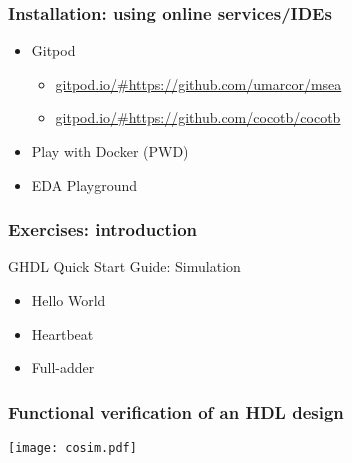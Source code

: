 \documentclass[xcolor={usenames,dvipsnames,svgnames}]{beamer}
\begin{document}
\begin{frame}
\frametitle{Installation: using online services/IDEs}
\vfill
\begin{itemize}
\item Gitpod \href{https://gitpod.io}{\faGlobe}
  \begin{itemize}
    \item \href{https://gitpod.io/\#https://github.com/umarcor/msea}{gitpod.io/\#https://github.com/umarcor/msea}
    \item \href{https://gitpod.io/\#https://github.com/cocotb/cocotb}{gitpod.io/\#https://github.com/cocotb/cocotb}
  \end{itemize}

\vfill

\item Play with Docker (PWD) \href{https://labs.play-with-docker.com/}{\faGlobe}

\vfill

\item EDA Playground \href{https://www.edaplayground.com/}{\faGlobe}

\end{itemize}
\vfill
\end{frame}

\begin{frame}
\frametitle{Exercises: introduction}
\vfill
\begin{center}
GHDL Quick Start Guide: Simulation \href{https://ghdl.github.io/ghdl/quick_start/simulation}{\faBook}
\end{center}
\vfill
\begin{itemize}
  \item Hello World
  \href{https://ghdl.github.io/ghdl/quick_start/simulation/hello}{\faBook}

  \vfill

  \item Heartbeat
  \href{https://ghdl.github.io/ghdl/quick_start/simulation/heartbeat}{\faBook}

  \vfill

  \item Full-adder
  \href{https://ghdl.github.io/ghdl/quick_start/simulation/adder}{\faBook}
\end{itemize}
\vfill
\end{frame}

\begin{frame}
\frametitle{Functional verification of an HDL design}
\centering
\texttt{[image: cosim.pdf]}
\end{frame}
\end{document}
